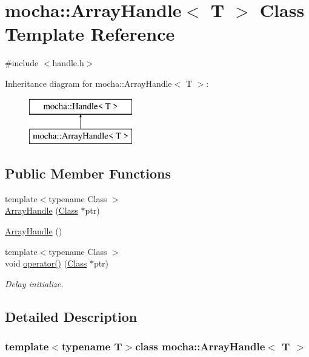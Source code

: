 \hypertarget{classmocha_1_1_array_handle}{
\section{mocha::ArrayHandle$<$ T $>$ Class Template Reference}
\label{classmocha_1_1_array_handle}
}


{\ttfamily \#include $<$handle.h$>$}

Inheritance diagram for mocha::ArrayHandle$<$ T $>$:\begin{figure}[H]
\begin{center}
\leavevmode
\includegraphics[height=2.000000cm]{classmocha_1_1_array_handle}
\end{center}
\end{figure}
\subsection*{Public Member Functions}
\begin{DoxyCompactItemize}
\item 
{\footnotesize template$<$typename Class $>$ }\\\hyperlink{classmocha_1_1_array_handle_ac4b94c0795061bac71e845e6716e4eb5}{ArrayHandle} (\hyperlink{classmocha_1_1_class}{Class} $\ast$ptr)
\item 
\hyperlink{classmocha_1_1_array_handle_a89ff1a03559e1b31594022dd13bc2c22}{ArrayHandle} ()
\item 
{\footnotesize template$<$typename Class $>$ }\\void \hyperlink{classmocha_1_1_array_handle_ad4a9cf2bce28823184e6d0e07e9f57b4}{operator()} (\hyperlink{classmocha_1_1_class}{Class} $\ast$ptr)
\begin{DoxyCompactList}\small\item\em Delay initialize. \end{DoxyCompactList}\end{DoxyCompactItemize}


\subsection{Detailed Description}
\subsubsection*{template$<$typename T$>$class mocha::ArrayHandle$<$ T $>$}



